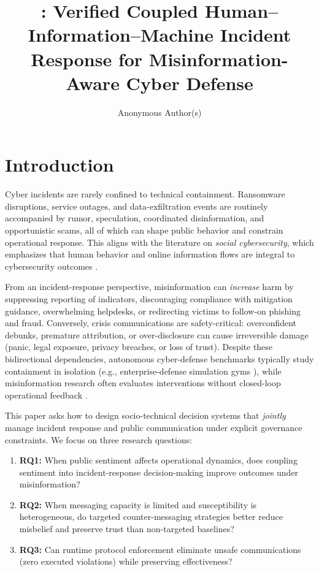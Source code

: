 \documentclass[referee,lineno,sn-basic]{sn-jnl}
\title[\model{}]{\model{}: Verified Coupled Human--Information--Machine Incident Response for Misinformation-Aware Cyber Defense}
\author*[1]{Anonymous Author(s)}
\affil[1]{Anonymous affiliation(s)}
\begin{document}
\maketitle

\section{Introduction}
Cyber incidents are rarely confined to technical containment. Ransomware disruptions, service outages, and data-exfiltration events are routinely accompanied by rumor, speculation, coordinated disinformation, and opportunistic scams, all of which can shape public behavior and constrain operational response. This aligns with the literature on \emph{social cybersecurity}, which emphasizes that human behavior and online information flows are integral to cybersecurity outcomes \citep{carley2020social,mulahuwaish2025survey}.

From an incident-response perspective, misinformation can \emph{increase} harm by suppressing reporting of indicators, discouraging compliance with mitigation guidance, overwhelming helpdesks, or redirecting victims to follow-on phishing and fraud. Conversely, crisis communications are safety-critical: overconfident debunks, premature attribution, or over-disclosure can cause irreversible damage (panic, legal exposure, privacy breaches, or loss of trust). Despite these bidirectional dependencies, autonomous cyber-defense benchmarks typically study containment in isolation (e.g., enterprise-defense simulation gyms \citep{baillie2020cyborg,kunz2023multiagent}), while misinformation research often evaluates interventions without closed-loop operational feedback \citep{lazer2018science,vosoughi2018spread,kozyreva2024toolbox,lewandowsky2021inoculation,ng2021platform}.

This paper asks how to design socio-technical decision systems that \emph{jointly} manage incident response and public communication under explicit governance constraints. We focus on three research questions:
\begin{enumerate}[leftmargin=*]
  \item \textbf{RQ1:} When public sentiment affects operational dynamics, does coupling sentiment into incident-response decision-making improve outcomes under misinformation?
  \item \textbf{RQ2:} When messaging capacity is limited and susceptibility is heterogeneous, do targeted counter-messaging strategies better reduce misbelief and preserve trust than non-targeted baselines?
  \item \textbf{RQ3:} Can runtime protocol enforcement eliminate unsafe communications (zero executed violations) while preserving effectiveness?
\end{enumerate}
\end{document}
